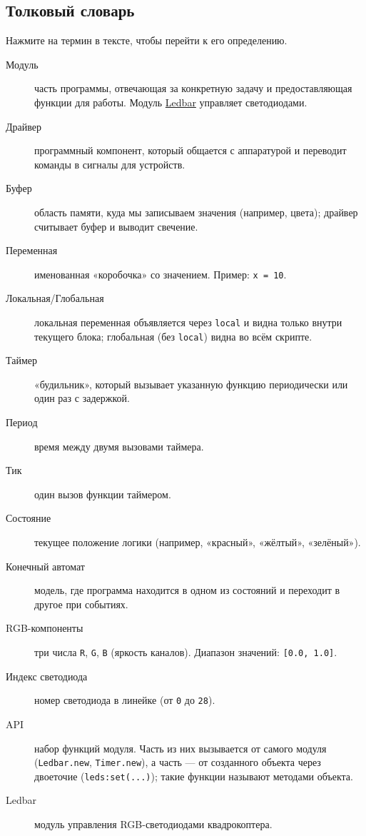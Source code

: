 \subsection{Толковый словарь}
Нажмите на термин в тексте, чтобы перейти к его определению.
\begin{description}
  \item[\hypertarget{term:module}{Модуль}] часть программы, отвечающая за конкретную задачу и предоставляющая функции для работы. Модуль \hyperlink{term:ledbar}{Ledbar} управляет светодиодами.
  \item[\hypertarget{term:driver}{Драйвер}] программный компонент, который общается с аппаратурой и переводит команды в сигналы для устройств.
  \item[\hypertarget{term:buffer}{Буфер}] область памяти, куда мы записываем значения (например, цвета); драйвер считывает буфер и выводит свечение.
  \item[\hypertarget{term:variable}{Переменная}] именованная «коробочка» со значением. Пример: \verb|x = 10|.
  \item[\hypertarget{term:scope}{Локальная/Глобальная}] локальная переменная объявляется через \verb|local| и видна только внутри текущего блока; глобальная (без \verb|local|) видна во всём скрипте.
  \item[\hypertarget{term:timer}{Таймер}] «будильник», который вызывает указанную функцию периодически или один раз с задержкой.
  \item[\hypertarget{term:period}{Период}] время между двумя вызовами таймера.
  \item[\hypertarget{term:tick}{Тик}] один вызов функции таймером.
  \item[\hypertarget{term:state}{Состояние}] текущее положение логики (например, «красный», «жёлтый», «зелёный»).
  \item[\hypertarget{term:automaton}{Конечный автомат}] модель, где программа находится в одном из состояний и переходит в другое при событиях.
  \item[\hypertarget{term:rgb}{RGB-компоненты}] три числа \verb|R|, \verb|G|, \verb|B| (яркость каналов). Диапазон значений: \verb|[0.0, 1.0]|.
  \item[\hypertarget{term:index}{Индекс светодиода}] номер светодиода в линейке (от \verb|0| до \verb|28|).
  \item[\hypertarget{term:api}{API}] набор функций модуля. Часть из них вызывается от самого модуля (\verb|Ledbar.new|, \verb|Timer.new|), а часть — от созданного объекта через двоеточие (\verb|leds:set(...)|); такие функции называют методами объекта.
  \item[\hypertarget{term:ledbar}{Ledbar}] модуль управления RGB-светодиодами квадрокоптера.
\end{description}

